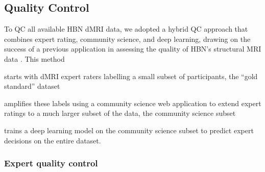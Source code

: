 \documentclass[9pt,lineno]{elife}
\begin{document}
\subsection{Quality Control}

To QC all available HBN dMRI data, we adopted a hybrid QC approach that
combines expert rating, community science, and deep learning, drawing on the
success of a previous application in assessing the quality of HBN's structural
MRI data \citep{keshavan2019-er}. This method
\begin{enumerate*}[%
    label=(\roman*),%
    before={{ }},%
    itemjoin={{; }},%
    itemjoin*={{ and }}]
    \item starts with dMRI expert raters labelling a small subset of participants,
    the ``gold standard'' dataset
    \item amplifies these labels using a community science web application to
    extend expert ratings to a much larger subset of the data, the community
    science subset
    \item trains a deep learning model on the community science subset to
    predict expert decisions on the entire dataset.
\end{enumerate*}

\subsubsection{Expert quality control}
\end{document}
